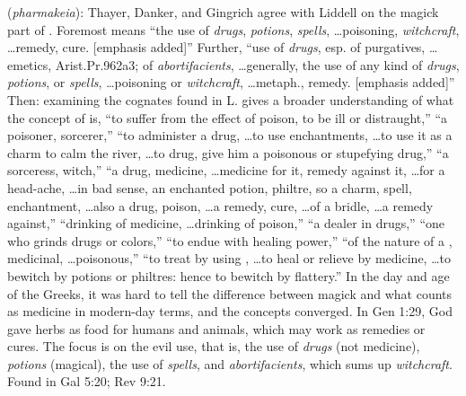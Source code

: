 \item[Witchcraft (use of),]

(\textit{pharmakeia}):
Thayer, Danker, and Gingrich agree with Liddell on the magick part of . 
Foremost  means ``the use of \emph{drugs}, \emph{potions}, \emph{spells}, \ldots poisoning, \emph{witchcraft}, \ldots remedy, cure. [emphasis added]''
Further, ``use of \emph{drugs}, esp. of purgatives, \ldots emetics, Arist.Pr.962a3; of \emph{abortifacients}, \ldots generally, the use of any kind of \emph{drugs}, \emph{potions}, or \emph{spells}, \ldots poisoning or \emph{witchcraft}, \ldots metaph., remedy. [emphasis added]'' 
Then: examining the cognates found in L. gives a broader understanding of what the concept of  is,  ``to suffer from the effect of poison, to be ill or distraught,''  ``a poisoner, sorcerer,''  ``to administer a drug, \ldots to use enchantments, \ldots to use it as a charm to calm the river, \ldots to drug, give him a poisonous or stupefying drug,''  ``a sorceress, witch,''  ``a drug, medicine, \ldots medicine for it, remedy against it, \ldots for a head-ache, \ldots in bad sense, an enchanted potion, philtre, so a charm, spell, enchantment, \ldots also a drug, poison, \ldots a remedy, cure, \ldots of a bridle, \ldots a remedy against,''  ``drinking of medicine, \ldots drinking of poison,''  ``a dealer in drugs,''  ``one who grinds drugs or colors,''  ``to endue with healing power,''  ``of the nature of a , medicinal, \ldots poisonous,''  ``to treat by using , \ldots to heal or relieve by medicine, \ldots to bewitch by potions or philtres: hence to bewitch by flattery.'' 
In the day and age of the Greeks, it was hard to tell the difference between magick and what counts as medicine in modern-day terms, and the concepts converged. In Gen 1:29, God gave herbs as food for humans and animals, which may work as remedies or cures. The focus is on the evil use, that is, the use of \emph{drugs} (not medicine), \emph{potions} (magical), the use of \emph{spells}, and \emph{abortifacients}, which sums up \emph{witchcraft}.
Found in Gal 5:20; Rev 9:21.
